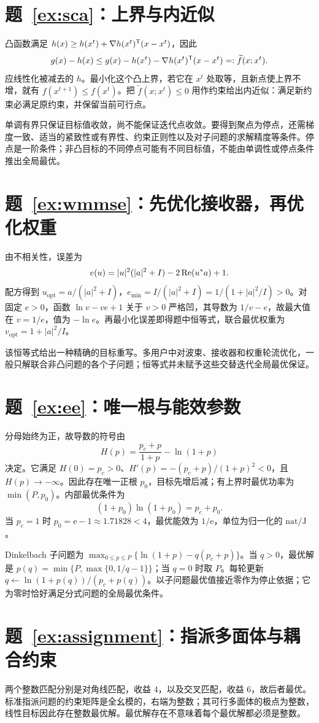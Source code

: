 \section*{题~\ref{ex:sca}：上界与内近似}
凸函数满足
$h(x)\geq h(x^t)+\nabla h(x^t)^{\mathsf T}(x-x^t)$，因此
\[
 g(x)-h(x)\leq
 g(x)-h(x^t)-\nabla h(x^t)^{\mathsf T}(x-x^t)
 =:\widetilde f(x;x^t).
\]
应线性化被减去的 $h$。最小化这个凸上界，若它在 $x^t$ 处取等，且新点使上界不增，就有 $f(x^{t+1})\leq f(x^t)$。把 $\widetilde f(x;x^t)\leq0$ 用作约束给出内近似：满足新约束必满足原约束，并保留当前可行点。

单调有界只保证目标值收敛，尚不能保证迭代点收敛。要得到聚点为停点，还需梯度一致、适当的紧致性或有界性、约束正则性以及对子问题的求解精度等条件。停点是一阶条件；非凸目标的不同停点可能有不同目标值，不能由单调性或停点条件推出全局最优。

\section*{题~\ref{ex:wmmse}：先优化接收器，再优化权重}
由不相关性，误差为
\[
 e(u)=|u|^2(|a|^2+I)-2\operatorname{Re}(u^*a)+1.
\]
配方得到 $u_{\mathrm{opt}}=a/(|a|^2+I)$，$e_{\min}=I/(|a|^2+I)=1/(1+|a|^2/I)>0$。对固定 $e>0$，函数 $\ln v-ve+1$ 关于 $v>0$ 严格凹，其导数为 $1/v-e$，故最大值在 $v=1/e$，值为 $-\ln e$。再最小化误差即得题中恒等式，联合最优权重为 $v_{\mathrm{opt}}=1+|a|^2/I$。

该恒等式给出一种精确的目标重写。多用户中对波束、接收器和权重轮流优化，一般只解联合非凸问题的各个子问题；恒等式并未赋予这些交替迭代全局最优保证。

\section*{题~\ref{ex:ee}：唯一根与能效参数}
分母始终为正，故导数的符号由
\[
 H(p)=\frac{p_c+p}{1+p}-\ln(1+p)
\]
决定。它满足 $H(0)=p_c>0$、$H'(p)=-(p_c+p)/(1+p)^2<0$，且 $H(p)\to-\infty$。因此存在唯一正根 $p_0$，目标先增后减；有上界时最优功率为 $\min(P,p_0)$。内部最优条件为
\[
 (1+p_0)\ln(1+p_0)=p_c+p_0.
\]
当 $p_c=1$ 时 $p_0=\mathrm e-1\approx1.71828<4$，最优能效为 $1/\mathrm e$，单位为归一化的 $\mathrm{nat/J}$。

Dinkelbach 子问题为 $\max_{0\leq p\leq P}\{\ln(1+p)-q(p_c+p)\}$。当 $q>0$，最优解是 $p(q)=\min\{P,\max\{0,1/q-1\}\}$；当 $q=0$ 时取 $P$。每轮更新 $q\leftarrow\ln(1+p(q))/(p_c+p(q))$。以子问题最优值接近零作为停止依据；它为零时恰好满足分式问题的全局最优条件。

\section*{题~\ref{ex:assignment}：指派多面体与耦合约束}
两个整数匹配分别是对角线匹配，收益 $4$，以及交叉匹配，收益 $6$，故后者最优。标准指派问题的约束矩阵是全幺模的，右端为整数；其可行多面体的极点为整数，线性目标因此存在整数最优解。最优解存在不意味着每个最优解都必须是整数。

